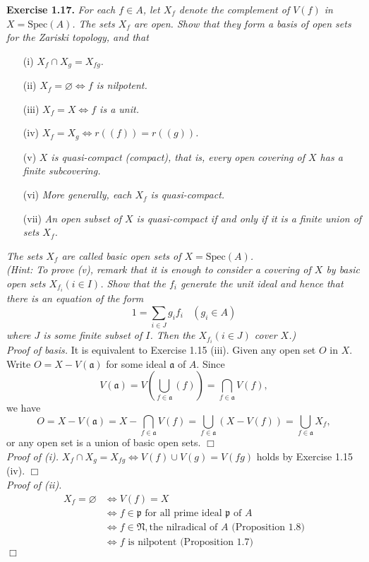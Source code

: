 \documentclass{article}
\begin{document}
\textbf{Exercise 1.17.}
\emph{For each $f \in A$,
let $X_f$ denote the complement of $V(f)$ in $X = \text{Spec}(A)$.
The sets $X_f$ are open.
Show that they form a basis of open sets for the Zariski topology, and that}
\begin{enumerate}
\item[(i)]
\emph{$X_f \cap X_g = X_{fg}$.}
\item[(ii)]
\emph{$X_f = \varnothing \Longleftrightarrow f$ is nilpotent.}
\item[(iii)]
\emph{$X_f = X \Longleftrightarrow f$ is a unit.}
\item[(iv)]
\emph{$X_f = X_g \Longleftrightarrow r((f)) = r((g))$.}
\item[(v)]
\emph{$X$ is quasi-compact (compact), that is,
every open covering of $X$ has a finite subcovering.}
\item[(vi)]
\emph{More generally, each $X_f$ is quasi-compact.}
\item[(vii)]
\emph{An open subset of $X$ is quasi-compact if and only if
it is a finite union of sets $X_f$.}
\end{enumerate}

\emph{The sets $X_f$ are called basic open sets of
$X = \text{Spec}(A)$.} \\

\emph{(Hint: To prove (v), remark that it is enough to consider a covering of $X$
by basic open sets $X_{f_i} (i \in I)$.
Show that the $f_i$ generate the unit ideal and hence that
there is an equation of the form
$$1 = \sum_{i \in J} g_i f_i \:\:\:\: (g_i \in A)$$
where $J$ is some finite subset of $I$.
Then the $X_{f_i} (i \in J)$ cover $X$.)} \\

\emph{Proof of basis.}
It is equivalent to Exercise 1.15 (iii).
Given any open set $O$ in $X$.
Write $O = X - V(\mathfrak{a})$ for some ideal $\mathfrak{a}$ of $A$.
Since
$$V(\mathfrak{a})
= V \left( \bigcup_{f \in \mathfrak{a}} (f) \right)
= \bigcap_{f \in \mathfrak{a}} V(f),$$
we have
$$O
= X - V(\mathfrak{a})
= X - \bigcap_{f \in \mathfrak{a}} V(f)
= \bigcup_{f \in \mathfrak{a}} (X - V(f))
= \bigcup_{f \in \mathfrak{a}} X_f,$$
or any open set is a union of basic open sets.
$\Box$ \\

\emph{Proof of (i).}
$X_f \cap X_g = X_{fg} \Longleftrightarrow V(f) \cup V(g) = V(fg)$ holds by Exercise 1.15 (iv).
$\Box$ \\

\emph{Proof of (ii).}
\begin{align*}
X_f = \varnothing
&\Longleftrightarrow V(f) = X \\
&\Longleftrightarrow f \in \mathfrak{p}
\text{ for all prime ideal $\mathfrak{p}$ of $A$} \\
&\Longleftrightarrow f \in \mathfrak{N},
\text{the nilradical of $A$ (Proposition 1.8)} \\
&\Longleftrightarrow f \text{ is nilpotent (Proposition 1.7)}
\end{align*}
$\Box$ \\
\end{document}

